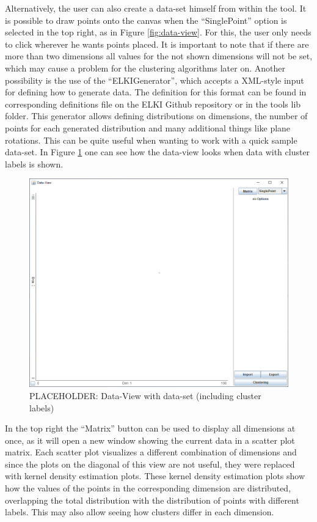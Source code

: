 \documentclass[
	a4paper,
	english,
	twoside,
	openright,               
	11pt                            
	]{report}
\begin{document}
Alternatively, the user can also create a data-set himself from within the tool. It is possible to draw points onto the canvas when the ``SinglePoint'' option is selected in the top right, as in Figure \ref{fig:data-view}. For this, the user only needs to click wherever he wants points placed. It is important to note that if there are more than two dimensions all values for the not shown dimensions will not be set, which may cause a problem for the clustering algorithms later on. Another possibility is the use of the ``ELKIGenerator'', which accepts a XML-style input for defining how to generate data. The definition for this format can be found in corresponding definitions file on the ELKI Github repository \cite{elkixml} or in the tools lib folder. This generator allows defining distributions on dimensions, the number of points for each generated distribution and many additional things like plane rotations. This can be quite useful when wanting to work with a quick sample data-set. In Figure \ref{fig:loaded-data} one can see how the data-view looks when data with cluster labels is shown. 

\begin{figure}[h]
	\centering
	\includegraphics[scale=.45]{data-view}
	\caption{PLACEHOLDER: Data-View with data-set (including cluster labels)}
	\label{fig:loaded-data}
\end{figure}

In the top right the ``Matrix'' button can be used to display all dimensions at once, as it will open a new window showing the current data in a scatter plot matrix. Each scatter plot visualizes a different combination of dimensions and since the plots on the diagonal of this view are not useful, they were replaced with kernel density estimation plots. These kernel density estimation plots show how the values of the points in the corresponding dimension are distributed, overlapping the total distribution with the distribution of points with different labels. This may also allow seeing how clusters differ in each dimension.
\end{document}
